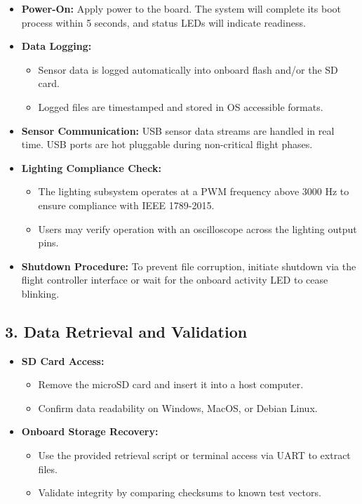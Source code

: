 \documentclass[12pt]{article}
\begin{document}
\begin{itemize}
    \item \textbf{Power-On:} Apply power to the board. The system will complete its boot process within 5 seconds, and status LEDs will indicate readiness.
    \item \textbf{Data Logging:}
    \begin{itemize}
        \item Sensor data is logged automatically into onboard flash and/or the SD card.
        \item Logged files are timestamped and stored in OS accessible formats.
    \end{itemize}
    \item \textbf{Sensor Communication:} USB sensor data streams are handled in real time. USB ports are hot pluggable during non-critical flight phases.
    \item \textbf{Lighting Compliance Check:}
    \begin{itemize}
        \item The lighting subsystem operates at a PWM frequency above 3000 Hz to ensure compliance with IEEE 1789-2015.
        \item Users may verify operation with an oscilloscope across the lighting output pins.
    \end{itemize}
    \item \textbf{Shutdown Procedure:} To prevent file corruption, initiate shutdown via the flight controller interface or wait for the onboard activity LED to cease blinking.
\end{itemize}

\subsection*{3. Data Retrieval and Validation}

\begin{itemize}
    \item \textbf{SD Card Access:}
    \begin{itemize}
        \item Remove the microSD card and insert it into a host computer.
        \item Confirm data readability on Windows, MacOS, or Debian Linux.
    \end{itemize}
    \item \textbf{Onboard Storage Recovery:}
    \begin{itemize}
        \item Use the provided retrieval script or terminal access via UART to extract files.
        \item Validate integrity by comparing checksums to known test vectors.
    \end{itemize}
\end{itemize}
\end{document}
